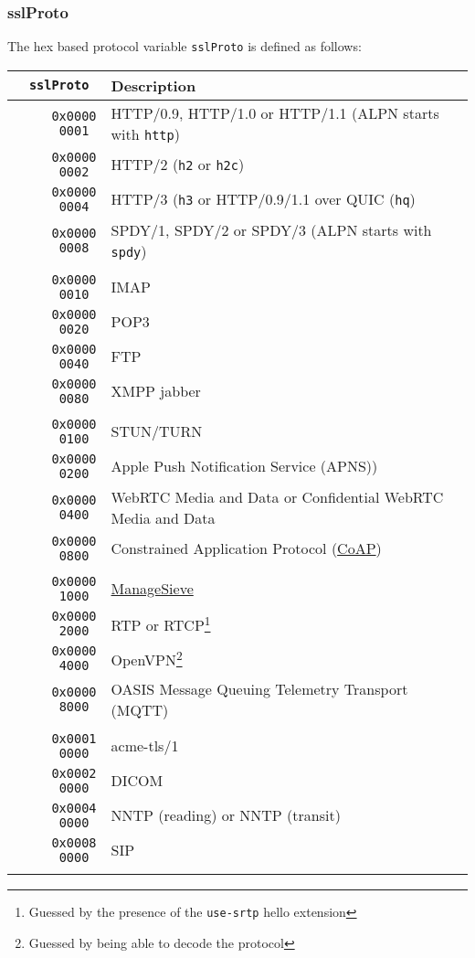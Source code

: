 \documentclass[documentation]{subfiles}
\begin{document}
\subsubsection{sslProto}\label{sslProto}
The hex based protocol variable {\tt sslProto} is defined as follows:
\begin{longtable}{>{\tt}rl}
    \toprule
    {\bf sslProto} & {\bf Description} \\
    \midrule\endhead%
    0x0000 0001 & HTTP/0.9, HTTP/1.0 or HTTP/1.1 (ALPN starts with {\tt http})\\
    0x0000 0002 & HTTP/2 ({\tt h2} or {\tt h2c})\\
    0x0000 0004 & HTTP/3 ({\tt h3} or HTTP/0.9/1.1 over QUIC ({\tt hq})\\
    0x0000 0008 & SPDY/1, SPDY/2 or SPDY/3 (ALPN starts with {\tt spdy})\\
    \\
    0x0000 0010 & IMAP \\
    0x0000 0020 & POP3 \\
    0x0000 0040 & FTP \\
    0x0000 0080 & XMPP jabber \\
    \\
    0x0000 0100 & STUN/TURN \\
    0x0000 0200 & Apple Push Notification Service (APNS)) \\
    0x0000 0400 & WebRTC Media and Data or Confidential WebRTC Media and Data\\
    0x0000 0800 & Constrained Application Protocol (\href{https://tools.ietf.org/html/rfc8323}{CoAP})\\
    \\
    0x0000 1000 & \href{https://tools.ietf.org/html/rfc5804}{ManageSieve} \\
    0x0000 2000 & RTP or RTCP\footnote{Guessed by the presence of the {\tt use-srtp} hello extension}\\
    0x0000 4000 & OpenVPN\footnote{Guessed by being able to decode the protocol}\\
    0x0000 8000 & OASIS Message Queuing Telemetry Transport (MQTT)\\
    \\
    0x0001 0000 & acme-tls/1\\
    0x0002 0000 & DICOM\\
    0x0004 0000 & NNTP (reading) or NNTP (transit)\\
    0x0008 0000 & SIP\\
    \\

\end{longtable}
\end{document}
